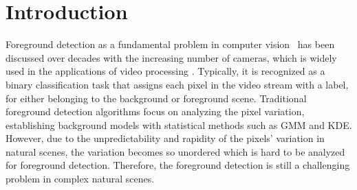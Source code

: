 \documentclass[journal]{IEEEtran}
\begin{document}
\IEEEpeerreviewmaketitle

\section{Introduction}
Foreground detection as a fundamental problem in computer vision\ \cite{Bouwmans201431} has been discussed over decades with the increasing number of cameras,
which is widely used in the applications of video processing \cite{Barnich2011_2011_TIP}.
Typically, it is recognized as a binary classification task that assigns each pixel in the video stream with a label, 
for either belonging to the background or foreground scene.
Traditional foreground detection algorithms focus on analyzing the pixel variation, establishing background models with statistical methods such as GMM\cite{Stauffer1999}\cite{lee2005} and KDE\cite{Elgammal2000Non}\cite{Mittal2004KDE}.
However, due to the unpredictability and rapidity of the pixels' variation in natural scenes,
the variation becomes so unordered which is hard to be analyzed for foreground detection.
Therefore, the foreground detection is still a challenging problem in complex natural scenes.
%
%

\end{document}
